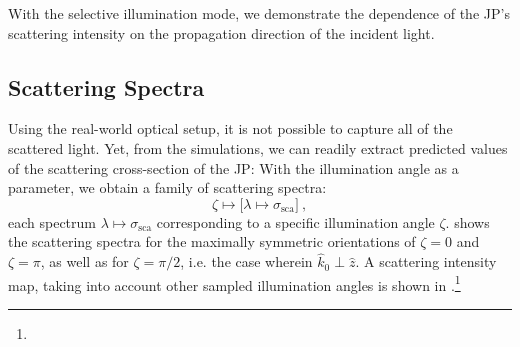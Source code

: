 \documentclass[10pt]{article}
\newcommand{\reffig}[2]{\mbox{\sffamily{Figure \ref{#1}#2}}}
\begin{document}

With the selective illumination mode, we demonstrate the dependence of the JP's scattering intensity on the propagation direction of the incident light. 



\subsection*{Scattering Spectra}

Using the real-world optical setup, it is not possible to capture all of the scattered light. 
Yet, from the simulations, we can readily extract predicted values of the scattering cross-section of the JP: 
With the illumination angle as a parameter, we obtain a family of scattering spectra:
$$\zeta \mapsto \bigl[ \lambda \mapsto \sigma_\mathrm{sca} \bigr] \ ,$$ 
each spectrum $\lambda\mapsto\sigma_\mathrm{sca}$ corresponding to a specific illumination angle $\zeta$. 
\reffig{fig:spectra-principal}{} shows the scattering spectra for the maximally symmetric orientations of $\zeta = 0$ and $\zeta = \pi$, as well as for $\zeta = \pi/2$, i.e. the case wherein $\hat{k}_0 \perp \hat{z}$. 
A scattering intensity map, taking into account other sampled illumination angles is shown in .\footnote{} 
\end{document}

